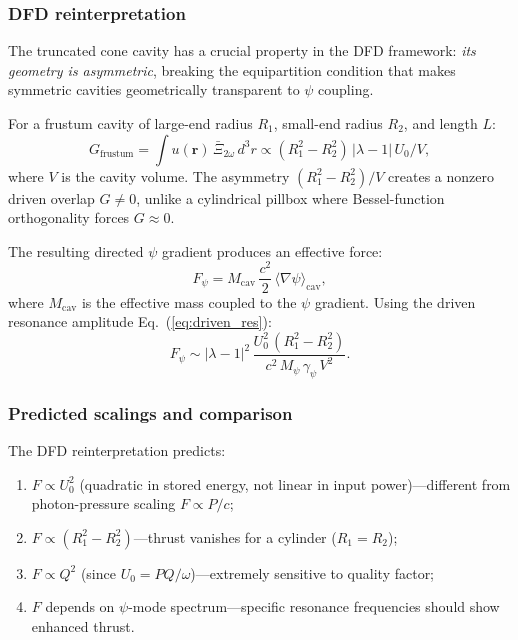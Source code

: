 \documentclass[12pt,aps,prd,twocolumn,superscriptaddress,nofootinbib]{revtex4-2}
\newcommand{\Mpsi}{M_\psi}
\begin{document}
\subsubsection{DFD reinterpretation}

The truncated cone cavity has a crucial property in the DFD framework:
\emph{its geometry is asymmetric}, breaking the equipartition condition
that makes symmetric cavities geometrically transparent to $\psi$
coupling.

For a frustum cavity of large-end radius $R_1$, small-end radius $R_2$,
and length $L$:
\begin{equation}
  G_{\mathrm{frustum}} = \int u(\mathbf{r})\,\bar{\Xi}_{2\omega}\,d^3r
  \propto (R_1^2 - R_2^2)\,|\lambda - 1|\,U_0/V,
  \label{eq:frustum_overlap}
\end{equation}
where $V$ is the cavity volume.  The asymmetry $(R_1^2 - R_2^2)/V$
creates a nonzero driven overlap $G \neq 0$, unlike a cylindrical
pillbox where Bessel-function orthogonality forces $G \approx 0$.

The resulting directed $\psi$ gradient produces an effective force:
\begin{equation}
  F_\psi = M_{\mathrm{cav}}\,\frac{c^2}{2}\,
  \langle\nabla\psi\rangle_{\mathrm{cav}},
  \label{eq:psi_thrust}
\end{equation}
where $M_{\mathrm{cav}}$ is the effective mass coupled to the
$\psi$ gradient.  Using the driven resonance amplitude
Eq.~(\ref{eq:driven_res}):
\begin{equation}
  F_\psi \sim |\lambda - 1|^2\,\frac{U_0^2\,(R_1^2 - R_2^2)}
    {c^2\,\Mpsi\,\gamma_\psi\,V^2}.
  \label{eq:emdrive_force}
\end{equation}

\subsubsection{Predicted scalings and comparison}

The DFD reinterpretation predicts:
\begin{enumerate}[noitemsep]
  \item $F \propto U_0^2$ (quadratic in stored energy, not linear in
    input power)---different from photon-pressure scaling $F \propto P/c$;
  \item $F \propto (R_1^2 - R_2^2)$---thrust vanishes for a cylinder
    ($R_1 = R_2$);
  \item $F \propto Q^2$ (since $U_0 = PQ/\omega$)---extremely
    sensitive to quality factor;
  \item $F$ depends on $\psi$-mode spectrum---specific resonance
    frequencies should show enhanced thrust.
\end{enumerate}
\end{document}
